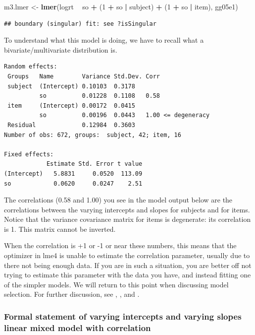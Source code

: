 \documentclass[12pt,]{krantz}
\newenvironment{Shaded}{\begin{snugshade}}{\end{snugshade}}
\newcommand{\DecValTok}[1]{\textcolor[rgb]{0.00,0.00,0.81}{#1}}
\newcommand{\KeywordTok}[1]{\textcolor[rgb]{0.13,0.29,0.53}{\textbf{#1}}}
\newcommand{\NormalTok}[1]{#1}
\newcommand{\OperatorTok}[1]{\textcolor[rgb]{0.81,0.36,0.00}{\textbf{#1}}}
\newcommand{\StringTok}[1]{\textcolor[rgb]{0.31,0.60,0.02}{#1}}
\begin{document}
\begin{Shaded}
\begin{Highlighting}[]
\NormalTok{m3.lmer <-}\StringTok{ }\KeywordTok{lmer}\NormalTok{(logrt }\OperatorTok{~}\StringTok{ }\NormalTok{so }\OperatorTok{+}\StringTok{ }\NormalTok{(}\DecValTok{1} \OperatorTok{+}\StringTok{ }\NormalTok{so }\OperatorTok{|}\StringTok{ }\NormalTok{subject) }\OperatorTok{+}\StringTok{ }\NormalTok{(}\DecValTok{1} \OperatorTok{+}\StringTok{ }
\StringTok{  }\NormalTok{so }\OperatorTok{|}\StringTok{ }\NormalTok{item), gg05e1)}
\end{Highlighting}
\end{Shaded}

\begin{verbatim}
## boundary (singular) fit: see ?isSingular
\end{verbatim}

To understand what this model is doing, we have to recall what a bivariate/multivariate distribution is.

\begin{verbatim}
Random effects:
 Groups   Name        Variance Std.Dev. Corr
 subject  (Intercept) 0.10103  0.3178       
          so          0.01228  0.1108   0.58
 item     (Intercept) 0.00172  0.0415       
          so          0.00196  0.0443   1.00 <= degeneracy
 Residual             0.12984  0.3603       
Number of obs: 672, groups:  subject, 42; item, 16

Fixed effects:
            Estimate Std. Error t value
(Intercept)   5.8831     0.0520  113.09
so            0.0620     0.0247    2.51
\end{verbatim}

The correlations (0.58 and 1.00) you see in the model output below are the correlations between the varying intercepts and slopes for subjects and for items. Notice that the variance covariance matrix for items is degenerate: its correlation is 1. This matrix cannot be inverted.

When the correlation is +1 or -1 or near these numbers, this means that the optimizer in lme4 is unable to estimate the correlation parameter, usually due to there not being enough data. If you are in such a situation, you are better off not trying to estimate this parameter with the data you have, and instead fitting one of the simpler models. We will return to this point when discussing model selection. For further discussion, see \citet{barr2013}, \citet{BatesEtAlParsimonious}, and \citet{hannesBEAP}.

\hypertarget{formal-statement-of-varying-intercepts-and-varying-slopes-linear-mixed-model-with-correlation}{%
\subsubsection{Formal statement of varying intercepts and varying slopes linear mixed model with correlation}\label{formal-statement-of-varying-intercepts-and-varying-slopes-linear-mixed-model-with-correlation}}
\end{document}
